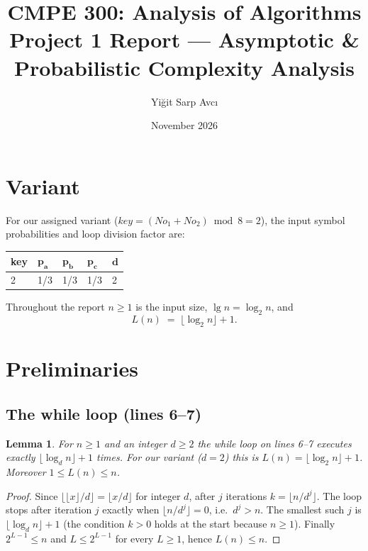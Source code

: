 \documentclass[11pt]{article}
\title{CMPE 300: Analysis of Algorithms\\[0.3em] \large Project 1 Report --- Asymptotic \& Probabilistic Complexity Analysis}
\author{Yi\u{g}it Sarp Avc\i{}}
\date{November 2026}
\newcommand{\fillcell}{\rule[-0.75em]{0pt}{2.3em}}
\newcommand{\lgn}{\lfloor \log_2 n \rfloor}
\newtheorem{lemma}{Lemma}
\theoremstyle{remark}
\begin{document}
\maketitle

\section{Variant}

For our assigned variant ($key = (No_1 + No_2) \bmod 8 = 2$), the input symbol probabilities and loop division factor are:

\begin{center}
\begin{tabular}{|C{2.2cm}|C{2.2cm}|C{2.2cm}|C{2.2cm}|C{2.2cm}|}
\hline
\textbf{key} & $\boldsymbol{p_a}$ & $\boldsymbol{p_b}$ & $\boldsymbol{p_c}$ & $\boldsymbol{d}$ \\ \hline
\fillcell 2 & 1/3 & 1/3 & 1/3 & 2 \\ \hline
\end{tabular}
\end{center}

\noindent Throughout the report $n\ge 1$ is the input size, $\lg n=\log_2 n$, and
\[
  L(n) \;=\; \lgn + 1 .
\]

\section{Preliminaries}

\subsection{The while loop (lines 6--7)}

\begin{lemma}\label{lem:L}
For $n\ge 1$ and an integer $d\ge 2$ the while loop on lines 6--7 executes exactly
$\lfloor \log_d n\rfloor + 1$ times. For our variant ($d=2$) this is $L(n)=\lgn+1$.
Moreover $1\le L(n)\le n$.
\end{lemma}
\begin{proof}
Since $\lfloor\lfloor x\rfloor/d\rfloor=\lfloor x/d\rfloor$ for integer $d$, after $j$ iterations
$k=\lfloor n/d^j\rfloor$. The loop stops after iteration $j$ exactly when
$\lfloor n/d^j\rfloor=0$, i.e.\ $d^j>n$. The smallest such $j$ is
$\lfloor\log_d n\rfloor+1$ (the condition $k>0$ holds at the start because $n\ge1$).
Finally $2^{L-1}\le n$ and $L\le 2^{L-1}$ for every $L\ge1$, hence $L(n)\le n$.
\end{proof}
\end{document}
